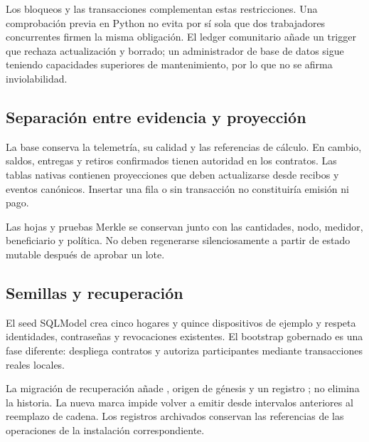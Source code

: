 Los bloqueos y las transacciones complementan estas restricciones. Una comprobación previa en Python no evita por sí sola que dos trabajadores concurrentes firmen la misma obligación. El ledger comunitario añade un trigger que rechaza actualización y borrado; un administrador de base de datos sigue teniendo capacidades superiores de mantenimiento, por lo que no se afirma inviolabilidad.

\subsection{Separación entre evidencia y proyección}
La base conserva la telemetría, su calidad y las referencias de cálculo. En cambio, saldos, entregas y retiros confirmados tienen autoridad en los contratos. Las tablas nativas contienen proyecciones que deben actualizarse desde recibos y eventos canónicos. Insertar una fila  o  sin transacción no constituiría emisión ni pago.

Las hojas y pruebas Merkle se conservan junto con las cantidades, nodo, medidor, beneficiario y política. No deben regenerarse silenciosamente a partir de estado mutable después de aprobar un lote.

\subsection{Semillas y recuperación}
El seed SQLModel crea cinco hogares y quince dispositivos de ejemplo y respeta identidades, contraseñas y revocaciones existentes. El bootstrap gobernado es una fase diferente: despliega contratos y autoriza participantes mediante transacciones reales locales.

La migración de recuperación añade , origen de génesis y un registro ; no elimina la historia. La nueva marca  impide volver a emitir desde intervalos anteriores al reemplazo de cadena. Los registros archivados conservan las referencias de las operaciones de la instalación correspondiente.
